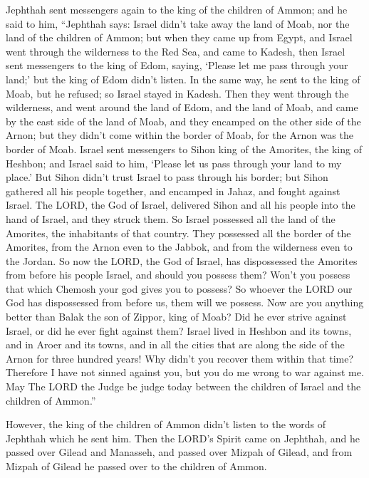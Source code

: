  Jephthah sent messengers again to the king of the children
of Ammon;  and he said to him, ``Jephthah says: Israel
didn't take away the land of Moab, nor the land of the children of
Ammon;  but when they came up from Egypt, and Israel went
through the wilderness to the Red Sea, and came to Kadesh, 
then Israel sent messengers to the king of Edom, saying, `Please let me
pass through your land;' but the king of Edom didn't listen. In the same
way, he sent to the king of Moab, but he refused; so Israel stayed in
Kadesh.  Then they went through the wilderness, and went
around the land of Edom, and the land of Moab, and came by the east side
of the land of Moab, and they encamped on the other side of the Arnon;
but they didn't come within the border of Moab, for the Arnon was the
border of Moab.  Israel sent messengers to Sihon king of
the Amorites, the king of Heshbon; and Israel said to him, `Please let
us pass through your land to my place.'  But Sihon didn't
trust Israel to pass through his border; but Sihon gathered all his
people together, and encamped in Jahaz, and fought against Israel.
 The LORD, the God of Israel, delivered Sihon and all his
people into the hand of Israel, and they struck them. So Israel
possessed all the land of the Amorites, the inhabitants of that country.
 They possessed all the border of the Amorites, from the
Arnon even to the Jabbok, and from the wilderness even to the Jordan.
 So now the LORD, the God of Israel, has dispossessed the
Amorites from before his people Israel, and should you possess them?
 Won't you possess that which Chemosh your god gives you to
possess? So whoever the LORD our God has dispossessed from before us,
them will we possess.  Now are you anything better than
Balak the son of Zippor, king of Moab? Did he ever strive against
Israel, or did he ever fight against them?  Israel lived in
Heshbon and its towns, and in Aroer and its towns, and in all the cities
that are along the side of the Arnon for three hundred years! Why didn't
you recover them within that time?  Therefore I have not
sinned against you, but you do me wrong to war against me. May The LORD
the Judge be judge today between the children of Israel and the children
of Ammon.''

 However, the king of the children of Ammon didn't listen
to the words of Jephthah which he sent him.  Then the
LORD's Spirit came on Jephthah, and he passed over Gilead and Manasseh,
and passed over Mizpah of Gilead, and from Mizpah of Gilead he passed
over to the children of Ammon.

